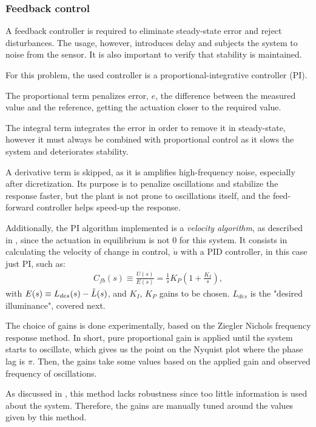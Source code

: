 \documentclass[english,fira]{ist-report}
\begin{document}
\subsubsection{Feedback control} 
\label{feedback control}

A feedback controller is required to eliminate steady-state error and reject disturbances. 
The usage, however, introduces delay and subjects the system to noise from the sensor. 
It is also important to verify that stability is maintained.

For this problem, the used controller is a proportional-integrative controller (PI). 

The proportional term penalizes error, $e$, the difference between the measured value and the reference, getting the actuation closer to the required value.

The integral term integrates the error in order to remove it in steady-state, however it must always be combined with proportional control as it slows the system and deteriorates stability.

A derivative term is skipped, as it is amplifies high-frequency noise, especially after dicretization.
Its purpose is to penalize oscillations and stabilize the response faster, but the plant is not prone to oscillations itself, and the feed-forward controller helps speed-up the response.

Additionally, the PI algorithm implemented is a \emph{velocity algorithm}, as described in \cite{bennett1994real}, since the actuation in equilibrium is not $0$ for this system. It consists in calculating the velocity of change in control, $\Dot{u}$ with a PID controller, in this case just PI, such as:
\begin{align}
    C_{fb}(s) \equiv \frac{U(s)}{E(s)} = \frac{1}{s}K_P\left( 1 + \frac{K_I}{s} \right),
    \label{eq:fb}
\end{align}
with $E(s) \equiv L_{des}(s)-\Tilde{L}(s)$, and $K_I$, $K_P$ gains to be chosen. $L_{des}$ is the "desired illuminance", covered next.

The choice of gains is done experimentally, based on the Ziegler Nichols frequency response method. 
In short, pure proportional gain is applied until the system starts to oscillate, which gives us the point on the Nyquist plot where the phase lag is $\pi$.
Then, the gains take some values based on the applied gain and observed frequency of oscillations.

As discussed in \cite{astrom2010feedback}, this method lacks robustness since too little information is used about the system. Therefore, the gains are manually tuned around the values given by this method. 
\begin{comment}
They are:
\begin{flalign*}
&K_P = 600& \\
&K_I = 0.00001&
\end{flalign*}
\end{comment}
\end{document}
